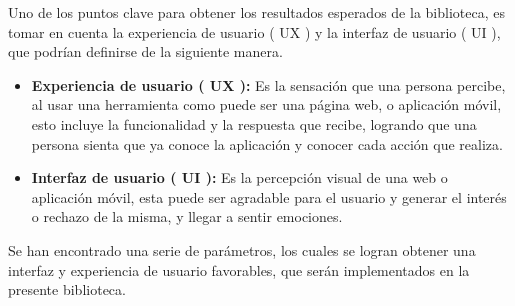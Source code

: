 Uno de los puntos clave para obtener los resultados esperados de la biblioteca, es tomar en cuenta la experiencia de usuario ( UX ) y la interfaz de usuario ( UI ), que podrían definirse de la siguiente manera.

\begin{itemize}
\item \textbf{Experiencia de usuario ( UX ): } Es la sensación que una persona percibe, al usar una herramienta como puede ser una página web, o aplicación móvil, esto incluye la funcionalidad y la respuesta que recibe, logrando que una persona sienta que ya conoce la aplicación y conocer cada acción que realiza.
\item \textbf{Interfaz de usuario ( UI ):  } Es la percepción visual de una web o aplicación móvil, esta puede ser agradable para el usuario y generar el interés o rechazo de la misma, y llegar a sentir emociones.
\end{itemize}

Se han encontrado una serie de parámetros, los cuales se logran obtener una interfaz y experiencia de usuario favorables, que serán implementados en la presente biblioteca.

